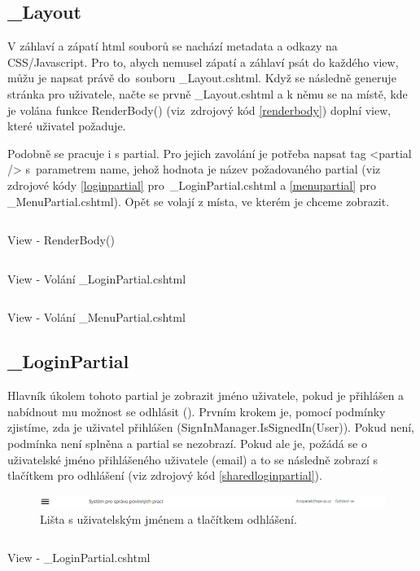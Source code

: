 \documentclass[a4paper, 12pt]{report}
\begin{document}
	\subsection{\_Layout}
	V záhlaví a zápatí html souborů se nachází metadata a odkazy na CSS/Javascript. Pro to, abych nemusel zápatí a záhlaví psát do každého view, můžu je napsat právě do~souboru \_Layout.cshtml. Když se následně generuje stránka pro uživatele, načte se prvně \_Layout.cshtml a k němu se na místě, kde je volána funkce RenderBody() (viz~zdrojový kód \ref{renderbody}) doplní view, které uživatel požaduje.\par
	Podobně se pracuje i s partial. Pro jejich zavolání je potřeba napsat tag <partial /> s~parametrem name, jehož hodnota je název požadovaného partial (viz zdrojové kódy \ref{loginpartial} pro~\_LoginPartial.cshtml a \ref{menupartial} pro \_MenuPartial.cshtml). Opět se volají z místa, ve kterém je chceme zobrazit.
	\begin{listing}[H]
		\inputminted{html}{SourceCode/Views/Body.html}
		\caption{View - RenderBody()}
		\label{renderbody}
	\end{listing}
	\begin{listing}[H]
		\inputminted{html}{SourceCode/Views/LoginPartial.html}
		\caption{View - Volání \_LoginPartial.cshtml}
		\label{loginpartial}
	\end{listing}
	\begin{listing}[H]
		\inputminted{html}{SourceCode/Views/MenuPartial.html}
		\caption{View - Volání \_MenuPartial.cshtml}
		\label{menupartial}
	\end{listing}

	\subsection{\_LoginPartial} \label{LoginPartial}
	Hlavník úkolem tohoto partial je zobrazit jméno uživatele, pokud je přihlášen a nabídnout mu možnost se odhlásit (). Prvním krokem je, pomocí podmínky zjistíme, zda je uživatel přihlášen (SignInManager.IsSignedIn(User)). Pokud není, podmínka není splněna a partial se nezobrazí. Pokud ale je, požádá se o uživatelské jméno přihlášeného uživatele (email) a to se následně zobrazí s tlačítkem pro odhlášení (viz zdrojový kód \ref{sharedloginpartial}).
	\begin{figure}[h!]
		\includegraphics[width=\textwidth]{ListaPrihlaseny}
		\caption{Lišta s uživatelským jménem a tlačítkem odhlášení.}
		\label{ListaPrihlaseny}
	\end{figure}
	\begin{listing}[H]
		\inputminted{html}{SourceCode/Views/Shared/_LoginPartial.html}
		\caption{View - \_LoginPartial.cshtml}
		\label{sharedloginpartial}
	\end{listing}
\end{document}
